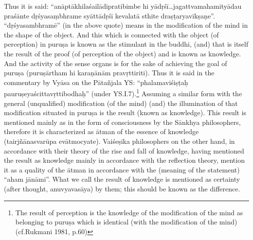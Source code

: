 Thus it is said: “anāptākhilaśailādipratibimbe hi yādṛśī…jagattvamaha\-mityādau praśānte dṛśyasaṃbhrame syāttādṛśī kevalatā sthite draṣṭa\-ryavīkṣaṇe”. “dṛśyasambhramē” (in the above quote) means in the modification of the mind in the shape of the object. And this which is connected with the object (of perception) in puruṣa is known as the stimulant in the buddhi, (and) that is itself the result of the proof (of perception of the object) and is known as knowledge. And the activity of the sense organs is for the sake of achieving the goal of puruṣa (puruṣārtham hi karaṇānām pravṛttiriti). Thus it is said in the commentary by Vyāsa on the Pātañjala YS: “phalamaviśiṣṭaḥ pauruṣeyaścittavṛttibodhaḥ” (under YS.I.7).\footnote{The result of perception is the knowledge of the modification of the mind as belonging to puruṣa which is identical (with the modification of the mind) (cf.Rukmani 1981, p.60)} Assuming a similar form with the general (unqualified) modification (of the mind) (and) the illumination of that modification situated in puruṣa is the result (known as knowledge). This result is mentioned mainly as in the form of consciousness by the Sānkhya philosophers, therefore it is characterized as ātman of the essence of knowledge (tairjñānasvarūpa evātmocyate). Vaiśeṣika philosophers on the other hand, in accordance with their theory of the rise and fall of knowledge, having mentioned the result as knowledge mainly in accordance with the reflection theory, mention it as a quality of the ātman in accordance with the (meaning of the statement) “aham jānāmi”. What we call the result of knowledge is mentioned as certainty (after thought, anuvyavasāya) by them; this should be known as the difference.




